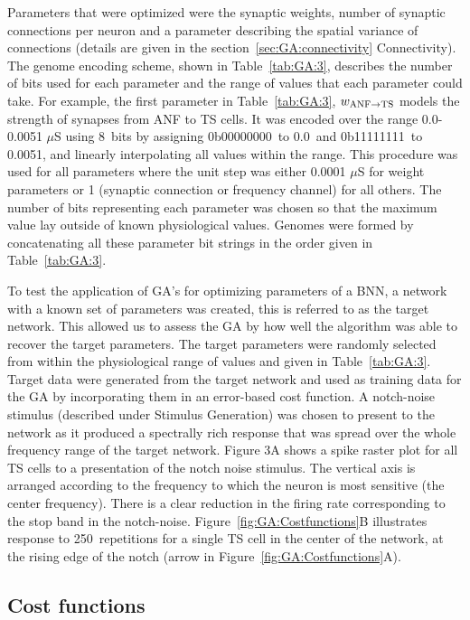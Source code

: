 \medskip{} 

Parameters that were optimized were the synaptic weights, number of
synaptic connections per neuron and a parameter describing the spatial
variance of connections (details are given in the
section~\ref{sec:GA:connectivity} Connectivity). The genome encoding
scheme, shown in Table~\ref{tab:GA:3}, describes the number of bits
used for each parameter and the range of values that each parameter
could take.  For example, the first parameter in Table~\ref{tab:GA:3},
$w_{{\rm ANF}\to{\rm TS}}$ models the strength of synapses from ANF to
TS cells. It was encoded over the range 0.0-0.0051 $\mu$S using 8~bits
by assigning 0b00000000~to 0.0~and 0b11111111~to 0.0051, and linearly
interpolating all values within the range. This procedure was used for
all parameters where the unit step was either 0.0001 $\mu$S for weight
parameters or 1 (synaptic connection or frequency channel) for all
others. The number of bits representing each parameter was chosen so
that the maximum value lay outside of known physiological
values. Genomes were formed by concatenating all these parameter bit
strings in the order given in Table~\ref{tab:GA:3}.

\medskip{}

To test the application of GA's for optimizing parameters of a BNN, a
network with a known set of parameters was created, this is referred
to as the target network.  This allowed us to assess the GA by how
well the algorithm was able to recover the target parameters. The
target parameters were randomly selected from within the physiological
range of values and given in Table~\ref{tab:GA:3}.  Target data were
generated from the target network and used as training data for the GA
by incorporating them in an error-based cost function.  A notch-noise
stimulus (described under Stimulus Generation) was chosen to present
to the network as it produced a spectrally rich response that was
spread over the whole frequency range of the target network.  Figure
3A shows a spike raster plot for all TS cells to a presentation of the
notch noise stimulus. The vertical axis is arranged according to the
frequency to which the neuron is most sensitive (the center
frequency). There is a clear reduction in the firing rate
corresponding to the stop band in the
notch-noise. Figure~\ref{fig:GA:Costfunctions}B illustrates response
to 250~repetitions for a single TS cell in the center of the network,
at the rising edge of the notch (arrow in
Figure~\ref{fig:GA:Costfunctions}A).


\subsection{Cost functions}\label{sec:GA:cost-functions}

